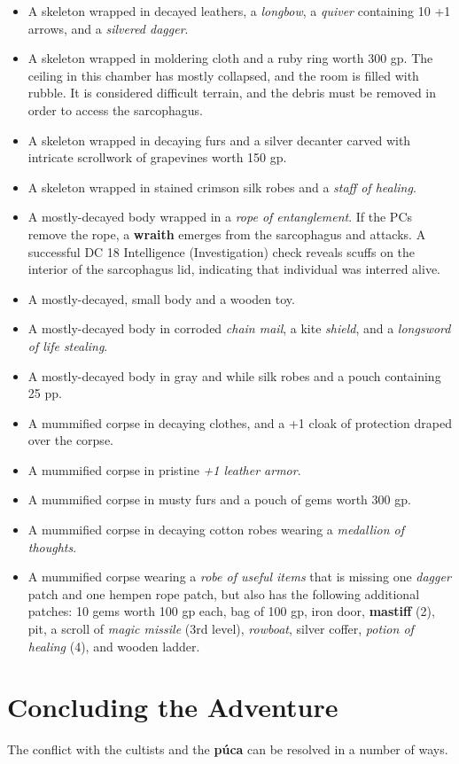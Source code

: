 \documentclass[10pt,a4paper,twoside,bg=print,twocolumn,openany,nodeprecatedcode]{dndbook}
\begin{document}
\begin{itemize}
\item A skeleton wrapped in decayed leathers, a \textit{longbow}, a \textit{quiver} containing 10 +1 arrows, and a \textit{silvered dagger}.
\item A skeleton wrapped in moldering cloth and a ruby ring worth 300 gp. The ceiling in this chamber has mostly collapsed, and the room is filled with rubble. It is considered difficult terrain, and the debris must be removed in order to access the sarcophagus.
\item A skeleton wrapped in decaying furs and a silver decanter carved with intricate scrollwork of grapevines worth 150 gp.
\item A skeleton wrapped in stained crimson silk robes and a \textit{staff of healing}.
\item A mostly-decayed body wrapped in a \textit{rope of entanglement}. If the PCs remove the rope, a \textbf{wraith} emerges from the sarcophagus and attacks. A successful DC 18 Intelligence (Investigation) check reveals scuffs on the interior of the sarcophagus lid, indicating that individual was interred alive.
\item A mostly-decayed, small body and a wooden toy.
\item A mostly-decayed body in corroded \textit{chain mail}, a kite \textit{shield}, and a \textit{longsword of life stealing}.
\item A mostly-decayed body in gray and while silk robes and a pouch containing 25 pp.
\item A mummified corpse in decaying clothes, and a +1 cloak of protection draped over the corpse.
\item A mummified corpse in pristine \textit{+1 leather armor}.
\item A mummified corpse in musty furs and a pouch of gems worth 300 gp.
\item A mummified corpse in decaying cotton robes wearing a \textit{medallion of thoughts}.
\item A mummified corpse wearing a \textit{robe of useful items} that is missing one \textit{dagger} patch and one hempen rope patch, but also has the following additional patches: 10 gems worth 100 gp each, bag of 100 gp, iron door, \textbf{mastiff} (2), pit, a scroll of \textit{magic missile} (3rd level), \textit{rowboat}, silver coffer, \textit{potion of healing} (4), and wooden ladder.
\end{itemize}

\section{Concluding the Adventure}
The conflict with the cultists and the \textbf{púca} can be resolved in a number of ways.
\end{document}
